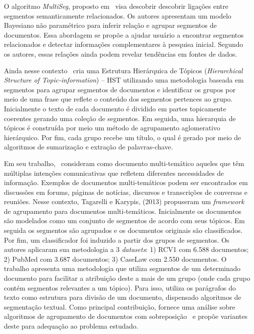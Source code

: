 O algoritmo \textit{MultiSeg}, proposto em~\cite{Jeong:2010} visa descobrir descobrir ligações entre segmentos semanticamente relacionados. Os autores apresentam um modelo Bayesiano não paramétrico para inferir relação e agrupar segmentos de documentos. Essa abordagem se propõe a ajudar usuário a encontrar segmentos relacionados e detectar informações complementares à pesquisa inicial. Segundo os autores, essas relações ainda podem revelar tendências em fontes de dados.



Ainda nesse contexto~\cite{Cuong2011} cria uma Estrutura Hierárquica de Tópicos (\textit{Hierarchical Structure of Topic-information}) -- HST utilizando uma metodologia baseada em segmentos para agrupar segmentos de documentos e identificar os grupos por meio de uma frase que reflete o conteúdo dos segmentos pertences ao grupo.
Inicialmente o texto de cada documento é dividido em partes topicamente coerentes gerando uma coleção de segmentos. Em seguida, uma hierarquia de tópicos é construída por meio um método de agrupamento aglomerativo hierárquico. Por fim, cada grupo recebe um título, o qual é gerado por meio de algoritmos de sumarização e extração de palavras-chave.


Em seu trabalho,~\cite{Tagarelli2013} consideram como documento multi-temático aqueles que têm múltiplas intenções comunicativas que refletem diferentes necessidades de informação.
Exemplos de documentos multi-temáticos podem ser encontrados em discussões em forums, páginas de notícias, discursos e transcrições de conversas e reuniões. Nesse contexto, Tagarelli e Karypis, (2013) propuseram um \textit{framework} de agrupamento para documentos multi-temáticos. %
Inicialmente os documentos são modelados como um conjunto de segmentos de acordo com seus tópicos. Em seguida os segmentos são agrupados e os documentos originais são classificados. Por fim, um classificador foi induzido a partir dos grupos de segmentos.
Os autores aplicaram sua metodologia a 3 \textit{datasets}: 1) RCV1 com 6.588 documentos; 2) PubMed com 3.687 documentos; 3) CaseLaw com 2.550 documentos. 
O trabalho apresenta uma metodologia que utiliza segmentos de um determinado documento para facilitar a atribuição deste a mais de um grupo (onde cada grupo contém segmentos relevantes a um tópico). Para isso, utiliza os parágrafos do texto como estrutura para divisão de um documento, dispensado algoritmos de segmentação textual. Como principal contribuição, fornece uma análise sobre algoritmos de agrupamento de documentos com sobreposição~\cite{Zhao2004a, Zhao2004b, Dhillon2001} e propõe variantes deste para adequação ao problema estudado. 







